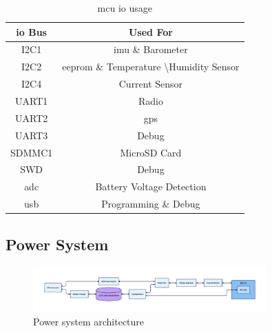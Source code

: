 \begin{table}
    \caption{\gls{mcu} \gls{io} usage}
    \label{tab:mcu-io}
    \begin{tabular}{cc}
        \toprule
        \textbf{\gls{io} Bus} & \textbf{Used For}                                          \\
        \midrule
        I2C1                  & \gls{imu} \& Barometer                                     \\
        I2C2                  & \gls{eeprom} \& Temperature \textbackslash Humidity Sensor \\
        I2C4                  & Current Sensor                                             \\
        UART1                 & Radio                                                      \\
        UART2                 & \gls{gps}                                                  \\
        UART3                 & Debug                                                      \\
        SDMMC1                & MicroSD Card                                               \\
        SWD                   & Debug                                                      \\
        \gls{adc}             & Battery Voltage Detection                                  \\
        \gls{usb}             & Programming \& Debug                                       \\
        \bottomrule
    \end{tabular}
\end{table}

\subsection{Power System}

\begin{figure}
    \centering
    \includegraphics[width=0.8\textwidth]{assets/diagrams/power_system.png}
    \caption{Power system architecture}
    \label{fig:power-system}
\end{figure}

